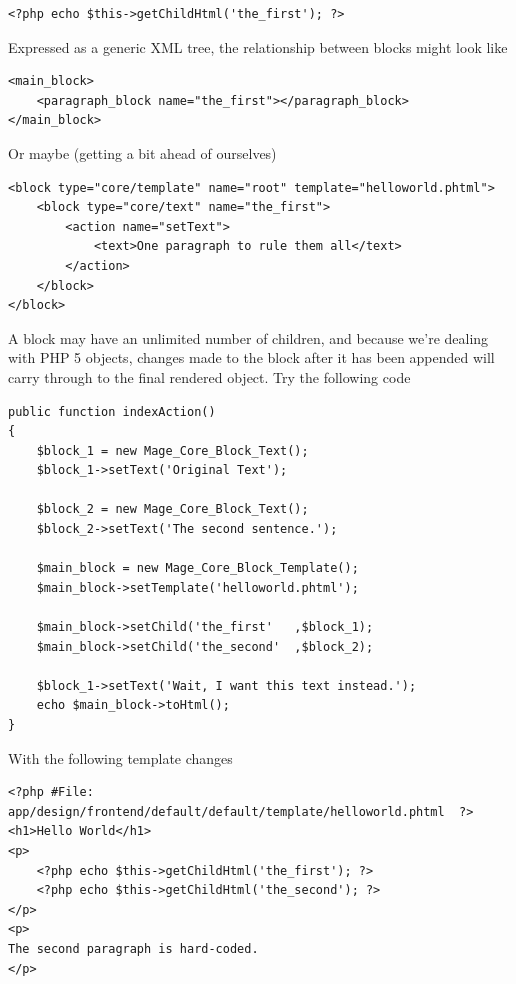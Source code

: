 \documentclass[oneside]{book}
\begin{document}
\begin{lstlisting}
<?php echo $this->getChildHtml('the_first'); ?>

\end{lstlisting}


Expressed as a generic XML tree, the relationship between blocks might look like

\begin{lstlisting}
<main_block>
    <paragraph_block name="the_first"></paragraph_block>
</main_block>

\end{lstlisting}


Or maybe (getting a bit ahead of ourselves)

\begin{lstlisting}
<block type="core/template" name="root" template="helloworld.phtml">
    <block type="core/text" name="the_first">
        <action name="setText">
            <text>One paragraph to rule them all</text>
        </action>
    </block>
</block>

\end{lstlisting}


A block may have an unlimited number of children, and because we're dealing with PHP 5 objects, changes made to the block after it has been appended will carry through to the final rendered object.  Try the following code

\begin{lstlisting}
public function indexAction()
{       
    $block_1 = new Mage_Core_Block_Text();
    $block_1->setText('Original Text');

    $block_2 = new Mage_Core_Block_Text();
    $block_2->setText('The second sentence.');      

    $main_block = new Mage_Core_Block_Template();
    $main_block->setTemplate('helloworld.phtml');

    $main_block->setChild('the_first'   ,$block_1);
    $main_block->setChild('the_second'  ,$block_2);

    $block_1->setText('Wait, I want this text instead.');
    echo $main_block->toHtml(); 
}

\end{lstlisting}


With the following template changes 

\begin{lstlisting}
<?php #File: app/design/frontend/default/default/template/helloworld.phtml  ?>
<h1>Hello World</h1>
<p>
    <?php echo $this->getChildHtml('the_first'); ?>
    <?php echo $this->getChildHtml('the_second'); ?>
</p>
<p>
The second paragraph is hard-coded.
</p>

\end{lstlisting}
\end{document}
